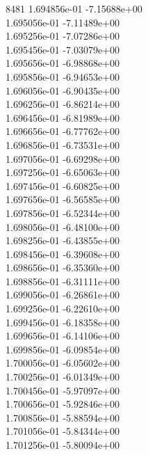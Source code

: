 8481	1.694856e-01	-7.15688e+00	\\ 	1.695056e-01	-7.11489e+00	\\ 	1.695256e-01	-7.07286e+00	\\ 	1.695456e-01	-7.03079e+00	\\ 	1.695656e-01	-6.98868e+00	\\ 	1.695856e-01	-6.94653e+00	\\ 	1.696056e-01	-6.90435e+00	\\ 	1.696256e-01	-6.86214e+00	\\ 	1.696456e-01	-6.81989e+00	\\ 	1.696656e-01	-6.77762e+00	\\ 	1.696856e-01	-6.73531e+00	\\ 	1.697056e-01	-6.69298e+00	\\ 	1.697256e-01	-6.65063e+00	\\ 	1.697456e-01	-6.60825e+00	\\ 	1.697656e-01	-6.56585e+00	\\ 	1.697856e-01	-6.52344e+00	\\ 	1.698056e-01	-6.48100e+00	\\ 	1.698256e-01	-6.43855e+00	\\ 	1.698456e-01	-6.39608e+00	\\ 	1.698656e-01	-6.35360e+00	\\ 	1.698856e-01	-6.31111e+00	\\ 	1.699056e-01	-6.26861e+00	\\ 	1.699256e-01	-6.22610e+00	\\ 	1.699456e-01	-6.18358e+00	\\ 	1.699656e-01	-6.14106e+00	\\ 	1.699856e-01	-6.09854e+00	\\ 	1.700056e-01	-6.05602e+00	\\ 	1.700256e-01	-6.01349e+00	\\ 	1.700456e-01	-5.97097e+00	\\ 	1.700656e-01	-5.92846e+00	\\ 	1.700856e-01	-5.88594e+00	\\ 	1.701056e-01	-5.84344e+00	\\ 	1.701256e-01	-5.80094e+00	\\ \hline
